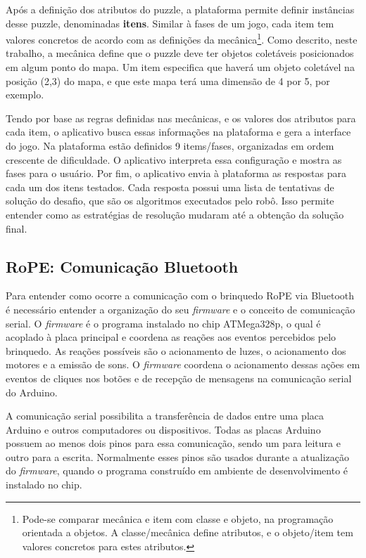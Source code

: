 Após a definição dos atributos do puzzle, a plataforma permite definir instâncias desse puzzle, denominadas \textbf{itens}. Similar à fases de um jogo, cada item tem valores concretos de acordo com as definições da mecânica\footnote{Pode-se comparar mecânica e item com classe e objeto, na programação orientada a objetos. A classe/mecânica define atributos, e o objeto/item tem valores concretos para estes atributos.}.  Como descrito, neste trabalho, a mecânica define que o puzzle deve ter objetos coletáveis posicionados em algum ponto do mapa. Um item especifica que haverá um objeto coletável na posição (2,3) do mapa, e que este mapa terá uma dimensão de 4 por 5, por exemplo. 

Tendo por base as regras definidas nas mecânicas, e os valores dos atributos para cada item, o aplicativo busca essas informações na plataforma e gera a interface do jogo. Na plataforma estão definidos 9 items/fases, organizadas em ordem crescente de dificuldade. O aplicativo interpreta essa configuração e mostra as fases para o usuário. Por fim, o aplicativo envia à plataforma as respostas para cada um dos itens testados. Cada resposta possui uma lista de tentativas de solução do desafio, que são os algoritmos executados pelo robô. Isso permite entender como as estratégias de resolução mudaram até a obtenção da solução final.

\subsection{RoPE: Comunicação Bluetooth}
\label{sec:comunicacao}
Para entender como ocorre a comunicação com o brinquedo RoPE via Bluetooth é necessário entender a organização do seu \textit{firmware} e o conceito de comunicação serial. O \textit{firmware} é o programa instalado no chip ATMega328p, o qual é acoplado à placa principal e coordena as reações aos eventos percebidos pelo brinquedo. As reações possíveis são o acionamento de  luzes, o acionamento dos motores e a emissão de sons. O \textit{firmware} coordena o acionamento dessas ações em eventos de cliques nos botões e de recepção de mensagens na comunicação serial do Arduino.

A comunicação serial possibilita a transferência de dados entre uma placa Arduino e outros computadores ou dispositivos. Todas as placas Arduino possuem ao menos dois pinos para essa comunicação, sendo um para leitura e outro para a escrita. Normalmente esses pinos são usados durante a atualização do \textit{firmware}, quando o programa construído em ambiente de desenvolvimento é instalado no chip.

